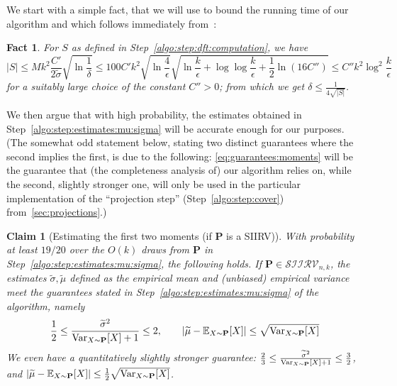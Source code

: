 \documentclass[11pt]{article}
\newcommand{\new}[1]{{\color{red} #1}}
\newcommand{\new}[1]{{#1}}
\newtheorem{claim}[theorem]{Claim}
\newtheorem{fact}[theorem]{Fact}
\theoremstyle{definition}
\newcommand{\E}{\mathbb{E}}
\newcommand{\p}{\mathbf{P}}
\newcommand{\eps}{\epsilon}
\newcommand{\abs}[1]{\lvert#1\rvert}
\newcommand{\Var}{\mathop{\textnormal{Var}}\nolimits}
\renewcommand{\abs}[1]{\left\lvert #1 \right\rvert}
\newcommand{\classksiirv}[2][n]{\ensuremath{\mathcal{SIIRV}_{#1,#2}}\xspace}
\begin{document}
We start with a simple fact, that we will use to bound the running time of our algorithm \new{and which follows immediately from~\cite[Claim 2.4]{DKS:16}:}
\begin{fact}\label{fact:bound:size:s}
  For $S$ as defined in Step~\ref{algo:step:dft:computation}, we have
  \[
  \abs{S} \leq Mk^2 \frac{C'}{2\widetilde{\sigma}} \sqrt{\ln\frac{1}{\delta}} \leq 100C' k^2 \sqrt{\ln\frac{4}{\eps}}\sqrt{\ln \frac{k}{\eps} +\log\log \frac{k}{\eps} + \frac{1}{2} \ln(16C'')}
  \leq C'' k^2\log^2\frac{k}{\eps}
  \]
  for a suitably large choice of the constant $C''>0$; from which we get $\delta \leq \frac{1}{4\sqrt{\abs{S}}}$.
\end{fact}

We then argue that with high probability, the estimates obtained in Step~\ref{algo:step:estimates:mu:sigma} will be accurate enough for our purposes. (The somewhat odd statement below, stating two distinct guarantees where the second implies the first, is due to the following: \cref{eq:guarantees:moments} will be the guarantee that (the completeness analysis of) our algorithm relies on, while the second, slightly stronger one, will only be used in the particular implementation of the ``projection step'' (Step~\ref{algo:step:cover}) from~\cref{sec:projections}.)
\begin{claim}[Estimating the first two moments (if $\p$ is a SIIRV)]\label{claim:estimate:moments}
  With probability at least $19/20$ over the $O(k)$ draws from $\p$ in Step~\ref{algo:step:estimates:mu:sigma}, the following holds. If $\p\in\classksiirv[n]{k}$, the estimates $\widetilde{\sigma},\widetilde{\mu}$ defined as the empirical mean and (unbiased) empirical variance meet the guarantees stated in Step~\ref{algo:step:estimates:mu:sigma} of the algorithm, namely
  \begin{equation}\label{eq:guarantees:moments}
      \frac{1}{2}\leq \frac{\widetilde{\sigma}^2}{\Var_{X \sim \p}[X]+1} \leq 2, \qquad \abs{ \widetilde{\mu} - \E_{X \sim \p}[X] } \leq  \sqrt{\Var_{X \sim \p}[X]}
  \end{equation}
  We even have a quantitatively slightly stronger guarantee:
  $
      \frac{2}{3}\leq \frac{\widetilde{\sigma}^2}{\Var_{X \sim \p}[X]+1} \leq \frac{3}{2}$, and $\abs{ \widetilde{\mu} - \E_{X \sim \p}[X] } \leq  \frac{1}{2}\sqrt{\Var_{X \sim \p}[X]}
  $.
\end{claim}
\end{document}
